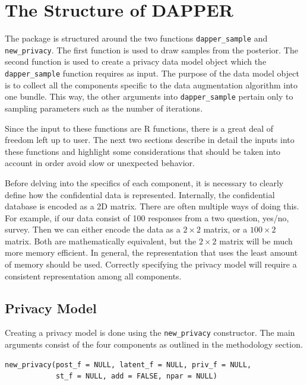 \hypertarget{the-structure-of-dapper}{%
\section{The Structure of DAPPER}\label{the-structure-of-dapper}}

The package is structured around the two functions \texttt{dapper\_sample} and
\texttt{new\_privacy}. The first function is used to draw samples from the
posterior. The second function is used to create a privacy data model object
which the \texttt{dapper\_sample} function requires as input. The purpose of the data model
object is to collect all the components specific to the data augmentation algorithm
into one bundle. This way, the other arguments into \texttt{dapper\_sample} pertain only
to sampling parameters such as the number of iterations.

Since the input to these functions are R functions, there is a great deal of freedom
left up to user. The next two sections describe in detail the inputs into
these functions and highlight some considerations that should be taken
into account in order avoid slow or unexpected behavior.

Before delving into the specifics of each component, it is necessary to clearly
define how the confidential data is represented. Internally, the
confidential database is encoded as a 2D matrix. There are often multiple ways
of doing this. For example, if our data consist
of 100 responses from a two question, yes/no, survey. Then we can either encode
the data as a \(2 \times 2\) matrix, or a \(100 \times 2\) matrix. Both are mathematically
equivalent, but the \(2 \times 2\) matrix will be much more memory efficient.
In general, the representation that uses the least amount of memory should be
used. Correctly specifying the privacy model will require a consistent
representation among all components.

\hypertarget{privacy-model}{%
\subsection{Privacy Model}\label{privacy-model}}

Creating a privacy model is done using the \texttt{new\_privacy} constructor. The
main arguments consist of the four components as outlined in the methodology
section.

\begin{verbatim}
new_privacy(post_f = NULL, latent_f = NULL, priv_f = NULL,
            st_f = NULL, add = FALSE, npar = NULL)
\end{verbatim}

